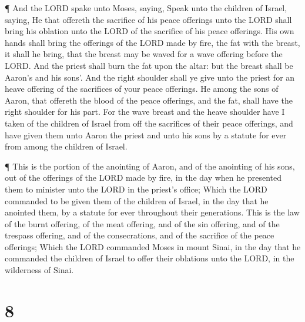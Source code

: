  ¶ And the LORD spake unto Moses, saying, 
Speak unto the children of Israel, saying, He that offereth the
sacrifice of his peace offerings unto the LORD shall bring his oblation
unto the LORD of the sacrifice of his peace offerings.  His
own hands shall bring the offerings of the LORD made by fire, the fat
with the breast, it shall he bring, that the breast may be waved for a
wave offering before the LORD.  And the priest shall burn
the fat upon the altar: but the breast shall be Aaron's and his sons'.
 And the right shoulder shall ye give unto the priest for
an heave offering of the sacrifices of your peace offerings.
 He among the sons of Aaron, that offereth the blood of the
peace offerings, and the fat, shall have the right shoulder for his
part.  For the wave breast and the heave shoulder have I
taken of the children of Israel from off the sacrifices of their peace
offerings, and have given them unto Aaron the priest and unto his sons
by a statute for ever from among the children of Israel.

 ¶ This is the portion of the anointing of Aaron, and of
the anointing of his sons, out of the offerings of the LORD made by
fire, in the day when he presented them to minister unto the LORD in the
priest's office;  Which the LORD commanded to be given them
of the children of Israel, in the day that he anointed them, by a
statute for ever throughout their generations.  This is the
law of the burnt offering, of the meat offering, and of the sin
offering, and of the trespass offering, and of the consecrations, and of
the sacrifice of the peace offerings;  Which the LORD
commanded Moses in mount Sinai, in the day that he commanded the
children of Israel to offer their oblations unto the LORD, in the
wilderness of Sinai.

\hypertarget{section-7}{%
\section{8}\label{section-7}}

